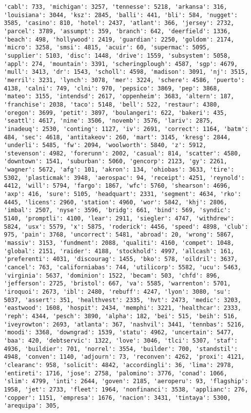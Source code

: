 \documentclass[11pt]{article}
\begin{document}
\begin{Verbatim}[commandchars=\\\{\}]
'cabl': 733, 'michigan': 3257, 'tennesse': 5218, 'arkansa': 316, 'louisiana': 3044, 'ksz': 2845, 'balli': 441, 'bli': 584, 'nugget': 3585, 'casino': 810, 'hotel': 2437, 'atlant': 366, 'jersey': 2732, 'parcel': 3789, 'assumpt': 359, 'branch': 642, 'deerfield': 1336, 'beach': 498, 'hollywood': 2419, 'guardian': 2250, 'goldom': 2174, 'micro': 3258, 'smsi': 4815, 'acuir': 60, 'supermac': 5095, 'supplier': 5103, 'disc': 1448, 'drive': 1559, 'subsystem': 5058, 'appl': 274, 'mountain': 3391, 'scheringplough': 4587, 'sgp': 4679, 'mull': 3413, 'dr': 1543, 'scholl': 4598, 'madison': 3091, 'nj': 3515, 'merril': 3231, 'lynch': 3078, 'mer': 3224, 'schere': 4586, 'puerto': 4138, 'calni': 749, 'clni': 970, 'pepsico': 3869, 'pep': 3868, 'mateo': 3155, 'intendsd': 2617, 'oppenheim': 3683, 'altern': 187, 'franchise': 2038, 'taco': 5148, 'bell': 522, 'restaur': 4380, 'oregon': 3699, 'petit': 3897, 'boulangeri': 622, 'bakeri': 435, 'seattl': 4617, 'nine': 3506, 'novemb': 3576, 'lariv': 2875, 'inadeuq': 2530, 'conting': 1127, 'iv': 2691, 'correct': 1164, 'batm': 484, 'sec': 4618, 'antitakeov': 260, 'mart': 3145, 'kresg': 2844, 'underli': 5485, 'fw': 2094, 'woolworth': 5840, 'z': 5912, 'stevenson': 4982, 'forerunn': 2002, 'casual': 814, 'scatter': 4580, 'downtown': 1541, 'suburban': 5060, 'gencorp': 2123, 'gy': 2261, 'wagner': 5672, 'afg': 101, 'akron': 134, 'ohiobas': 3633, 'tire': 5302, 'plasticmak': 3948, 'aerospac': 94, 'receipt': 4251, 'reynold': 4412, 'will': 5794, 'fargo': 1867, 'wfc': 5760, 'shearson': 4696, 'axp': 416, 'sure': 5105, 'headquart': 2331, 'segment': 4634, 'rko': 4445, 'licens': 2960, 'station': 4960, 'wor': 5842, 'khj': 2806, 'imbal': 2507, 'nyse': 3596, 'bridg': 661, 'bind': 569, 'syndic': 5140, 'promptli': 4100, 'lear': 2911, 'siegler': 4747, 'withdrew': 5824, 'usx': 5579, 'x': 5875, 'roderick': 4456, 'speed': 4898, 'club': 975, 'pain': 3768, 'uncorrect': 5481, 'abroad': 20, 'wrong': 5867, 'massiv': 3153, 'fundment': 2088, 'qualiti': 4160, 'compet': 1048, 'global': 2151, 'raider': 4188, 'stockhold': 4997, 'allcash': 161, 'preferenti': 4031, 'discourag': 1455, 'bko': 578, 'oildril': 3637, 'cancel': 763, 'californiabas': 744, 'utilicorp': 5582, 'ucu': 5463, 'virginia': 5637, 'dominion': 1522, 'becam': 503, 'chfd': 896, 'jefferson': 2725, 'bristol': 667, 'va': 5585, 'warrenton': 5701, 'iroquoi': 2673, 'ibl': 2480, 'rebuff': 4247, 'lyon': 3080, 'su': 5037, 'assert': 351, 'healthvest': 2335, 'hvt': 2473, 'medic': 3203, 'eastwood': 1608, 'hospit': 2434, 'memphi': 3221, 'healthcar': 2333, 'reph': 4344, 'pesch': 3890, 'alpha': 182, 'bei': 515, 'beih': 516, 'iveyrowton': 2693, 'atlanta': 367, 'nashvil': 3441, 'tennbas': 5216, 'moodi': 3368, 'downgrad': 1539, 'statu': 4962, 'uncertain': 5477, 'baa': 420, 'debtservic': 1322, 'love': 3046, 'tlci': 5307, 'staf': 4936, 'buildier': 701, 'norrel': 3554, 'builder': 700, 'standstil': 4948, 'conven': 1140, 'adjourn': 73, 'reconven': 4262, 'proxi': 4121, 'clearanc': 958, 'solicit': 4842, 'accordingli': 36, 'lima': 2978, 'entireti': 1716, 'jose': 2758, 'palomino': 3776, 'conad': 1066, 'slim': 4799, 'inti': 2644, 'goven': 2185, 'aeroperu': 93, 'flagship': 1958, 'jet': 2733, 'fleet': 1964, 'nonfinanci': 3538, 'applianc': 276, 'copper': 1151, 'empresa': 1676, 'nacion': 3431, 'tintaya': 5300, 'arequipa': 305, 
\end{Verbatim}
\end{document}
